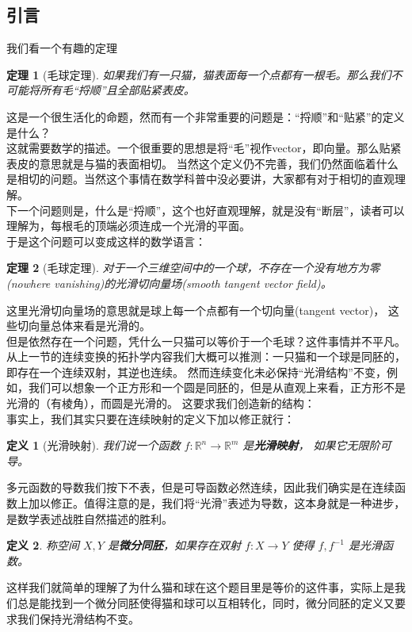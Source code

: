 \documentclass[a4paper,10pt]{article}
\newtheorem{definition}{定义}[section]
\newtheorem{theorem}{定理}[section]
\begin{document}
\subsection{引言}
我们看一个有趣的定理
\begin{theorem}[毛球定理]
    如果我们有一只猫，猫表面每一个点都有一根毛。那么我们不可能将所有毛“捋顺”且全部贴紧表皮。
\end{theorem}
这是一个很生活化的命题，然而有一个非常重要的问题是：“捋顺”和“贴紧”的定义是什么？\\
这就需要数学的描述。一个很重要的思想是将“毛”视作vector，即向量。那么贴紧表皮的意思就是与猫的表面相切。
当然这个定义仍不完善，我们仍然面临着什么是相切的问题。当然这个事情在数学科普中没必要讲，大家都有对于相切的直观理解。\\
下一个问题则是，什么是“捋顺”，这个也好直观理解，就是没有“断层”，读者可以理解为，每根毛的顶端必须连成一个光滑的平面。\\
于是这个问题可以变成这样的数学语言：
\begin{theorem}[毛球定理]
    对于一个三维空间中的一个球，不存在一个没有地方为零(nowhere vanishing)的光滑切向量场(smooth tangent vector field)。
\end{theorem}
这里光滑切向量场的意思就是球上每一个点都有一个切向量(tangent vector)， 这些切向量总体来看是光滑的。\\
但是依然存在一个问题，凭什么一只猫可以等价于一个毛球？这件事情并不平凡。
从上一节的连续变换的拓扑学内容我们大概可以推测：一只猫和一个球是同胚的，即存在一个连续双射，其逆也连续。
然而连续变化未必保持“光滑结构”不变，例如，我们可以想象一个正方形和一个圆是同胚的，但是从直观上来看，正方形不是光滑的（有棱角），而圆是光滑的。
这要求我们创造新的结构：\\
事实上，我们其实只要在连续映射的定义下加以修正就行：
\begin{definition}[光滑映射]
    我们说一个函数 $ f:\mathbb{R}^n\rightarrow \mathbb{R}^m $ 是\textbf{光滑映射}， 如果它无限阶可导。 
\end{definition}
多元函数的导数我们按下不表，但是可导函数必然连续，因此我们确实是在连续函数上加以修正。值得注意的是，我们将“光滑”表述为导数，这本身就是一种进步，是数学表述战胜自然描述的胜利。
\begin{definition}
    称空间 $ X,Y $ 是\textbf{微分同胚}，如果存在双射 $ f:X\rightarrow Y $ 使得 $ f,f^{-1} $ 是光滑函数。   
\end{definition}
这样我们就简单的理解了为什么猫和球在这个题目里是等价的这件事，实际上是我们总是能找到一个微分同胚使得猫和球可以互相转化，同时，微分同胚的定义又要求我们保持光滑结构不变。\\
\end{document}
